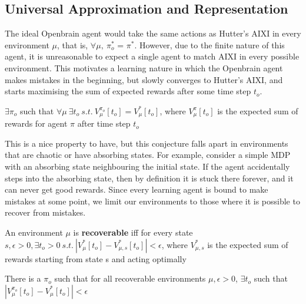 \subsection{Universal Approximation and Representation}

The ideal Openbrain agent would take the same actions as Hutter's AIXI in every environment $\mu$, that is, $\forall \mu,\ \pi_o^*$ = $\pi^*$. However, due to the finite nature of this agent, it is unreasonable to expect a single agent to match AIXI in every possible environment. This motivates a learning nature in which the Openbrain agent makes mistakes in the beginning, but slowly converges to Hutter's AIXI, and starts maximising the sum of expected rewards after some time step $t_o$.

\begin{conjecture}
    $\exists \pi_o$ such that $\forall \mu \ \exists t_o \ s.t.\  V_\mu^{\pi_o}[t_o] = V_\mu^*[t_o] $, where $V_\mu^{\pi}[t_o]$ is the expected sum of rewards for agent $\pi$ after time step $t_o$
\end{conjecture}

This is a nice property to have, but this conjecture falls apart in environments that are chaotic or have absorbing states. For example, consider a simple MDP with an absorbing state neighbouring the initial state. If the agent accidentally steps into the absorbing state, then by definition it is stuck there forever, and it can never get good rewards. Since every learning agent is bound to make mistakes at some point, we limit our environments to those where it is possible to recover from mistakes.

\begin{definition}
    An environment $\mu$ is \textbf{recoverable} iff for every state $s, \epsilon > 0, \exists t_o > 0\  s.t.\ |V_\mu^*[t_o]-V_{\mu,s}^*[t_o]| < \epsilon$, where $V_{\mu,s}^*$ is the expected sum of rewards starting from state s and acting optimally
\end{definition}


\begin{conjecture}
    There is a $\pi_o$ such that for all recoverable environments $\mu, \epsilon > 0$, $\exists t_o$ such that $|V_\mu^{\pi_o}[t_o]-V_\mu^*[t_o]|<\epsilon$
\end{conjecture}